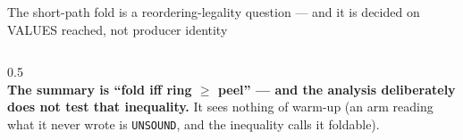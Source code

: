 \begin{frame}{The short-path fold is a reordering-legality question --- and it is decided on VALUES reached, not producer identity}
\begin{columns}[T]
\begin{column}{0.5\textwidth}
\\[3pt]
\textbf{The summary is ``fold iff ring $\ge$ peel'' --- and the analysis deliberately does not test that
inequality.} It sees nothing of warm-up (an arm reading what it never wrote is \texttt{UNSOUND}, and the
inequality calls it foldable).\\[3pt]
\end{column}
\end{columns}
\end{frame}
